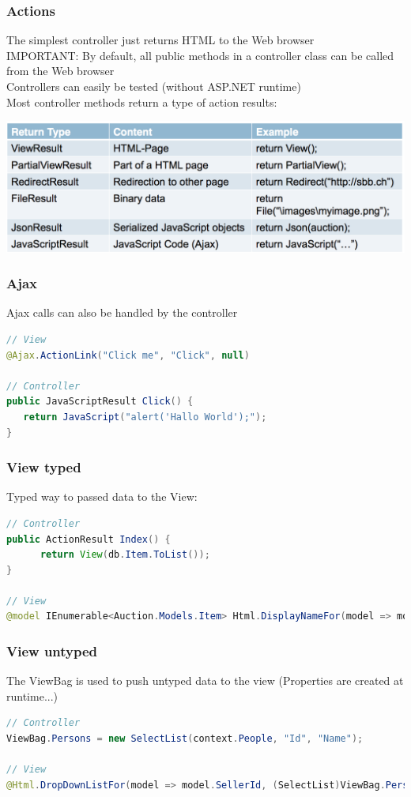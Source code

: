 \documentclass[10pt]{article}
\begin{document}
\subsubsection{Actions}
The simplest controller just returns HTML to the Web browser \\
IMPORTANT: By default, all public methods in a controller class can be called from the Web browser \\
Controllers can easily be tested (without ASP.NET runtime) \\
Most controller methods return a type of action results:
\begin{center}
	\includegraphics[scale=0.3]{mvc_controller_actions.png}
\end{center}
\subsubsection{Ajax}
Ajax calls can also be handled by the controller
\begin{lstlisting}[language=Java, caption=Ajax:, style=JavaStyle]
// View
@Ajax.ActionLink("Click me", "Click", null)

// Controller
public JavaScriptResult Click() {
   return JavaScript("alert('Hallo World');");
}
\end{lstlisting}
\subsubsection{View typed}
Typed way to passed data to the View:
\begin{lstlisting}[language=Java, caption=typed view:, style=JavaStyle]
// Controller
public ActionResult Index() {
      return View(db.Item.ToList());
}

// View
@model IEnumerable<Auction.Models.Item> Html.DisplayNameFor(model => model.StartPrice)
\end{lstlisting}
\subsubsection{View untyped}
The ViewBag is used to push untyped data to the view (Properties are created at runtime...)
\begin{lstlisting}[language=Java, caption=typed view:, style=JavaStyle]
// Controller
ViewBag.Persons = new SelectList(context.People, "Id", "Name");

// View
@Html.DropDownListFor(model => model.SellerId, (SelectList)ViewBag.Persons)
\end{lstlisting}
\end{document}
